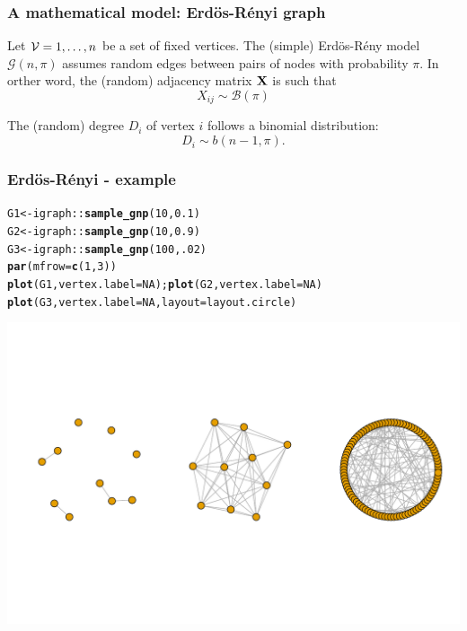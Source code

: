 \documentclass{beamer}\usepackage[]{graphicx}\usepackage[]{color}
\makeatletter
\newcommand{\hlnum}[1]{\textcolor[rgb]{0.686,0.059,0.569}{#1}}%
\newcommand{\hlopt}[1]{\textcolor[rgb]{0,0,0}{#1}}%
\newcommand{\hlstd}[1]{\textcolor[rgb]{0.345,0.345,0.345}{#1}}%
\newcommand{\hlkwb}[1]{\textcolor[rgb]{0.69,0.353,0.396}{#1}}%
\newcommand{\hlkwc}[1]{\textcolor[rgb]{0.333,0.667,0.333}{#1}}%
\newcommand{\hlkwd}[1]{\textcolor[rgb]{0.737,0.353,0.396}{\textbf{#1}}}%
\newenvironment{kframe}{%
 \def\at@end@of@kframe{}%
 \ifinner\ifhmode%
  \def\at@end@of@kframe{\end{minipage}}%
  \begin{minipage}{\columnwidth}%
 \fi\fi%
 \def\FrameCommand##1{\hskip\@totalleftmargin \hskip-\fboxsep
 \colorbox{shadecolor}{##1}\hskip-\fboxsep
     \hskip-\linewidth \hskip-\@totalleftmargin \hskip\columnwidth}%
 \MakeFramed {\advance\hsize-\width
   \@totalleftmargin\z@ \linewidth\hsize
   \@setminipage}}%
 {\par\unskip\endMakeFramed%
 \at@end@of@kframe}
\newenvironment{knitrout}{}{} %
\makeatother
\begin{document}
\begin{frame}
  \frametitle{A mathematical model: Erdös-Rényi graph}

  \begin{definition}
    Let $\mathcal{V} = {1,\dots,n}$ be a set of fixed vertices. The (simple) Erdös-Rény model $\mathcal{G}(n,\pi)$ assumes random edges between pairs of nodes with probability $\pi$. In orther word, the (random) adjacency matrix $\mathbf{X}$ is such that
    \begin{equation*}
      X_{ij} \sim \mathcal{B}(\pi)
    \end{equation*}
  \end{definition}

  \vfill

  \begin{proposition}
    The (random) degree $D_i$ of vertex $i$ follows a binomial distribution:
      \begin{equation*}
        D_i \sim b(n-1, \pi).
      \end{equation*}
  \end{proposition}

\end{frame}

\begin{frame}[fragile]
  \frametitle{Erdös-Rényi - example}

\begin{knitrout}\scriptsize
{}\color{fgcolor}\begin{kframe}
\begin{alltt}
\hlstd{G1} \hlkwb{<-} \hlstd{igraph}\hlopt{::}\hlkwd{sample_gnp}\hlstd{(}\hlnum{10}\hlstd{,} \hlnum{0.1}\hlstd{)}
\hlstd{G2} \hlkwb{<-} \hlstd{igraph}\hlopt{::}\hlkwd{sample_gnp}\hlstd{(}\hlnum{10}\hlstd{,} \hlnum{0.9}\hlstd{)}
\hlstd{G3} \hlkwb{<-} \hlstd{igraph}\hlopt{::}\hlkwd{sample_gnp}\hlstd{(}\hlnum{100}\hlstd{,} \hlnum{.02}\hlstd{)}
\hlkwd{par}\hlstd{(}\hlkwc{mfrow}\hlstd{=}\hlkwd{c}\hlstd{(}\hlnum{1}\hlstd{,}\hlnum{3}\hlstd{))}
\hlkwd{plot}\hlstd{(G1,} \hlkwc{vertex.label}\hlstd{=}\hlnum{NA}\hlstd{) ;} \hlkwd{plot}\hlstd{(G2,} \hlkwc{vertex.label}\hlstd{=}\hlnum{NA}\hlstd{)}
\hlkwd{plot}\hlstd{(G3,} \hlkwc{vertex.label}\hlstd{=}\hlnum{NA}\hlstd{,} \hlkwc{layout}\hlstd{=layout.circle)}
\end{alltt}
\end{kframe}
\includegraphics[width=.8\textwidth]{figures/ER_example-1} 

\end{knitrout}
\end{frame}
\end{document}
